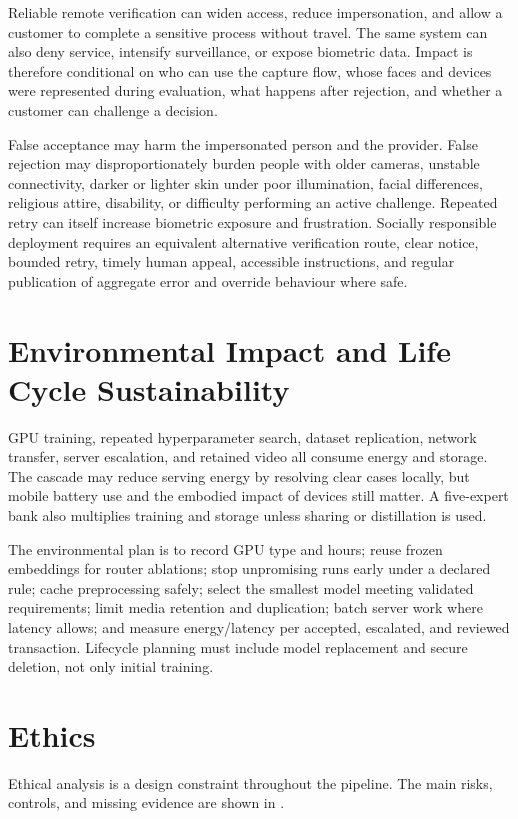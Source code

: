 Reliable remote verification can widen access, reduce impersonation, and allow a
customer to complete a sensitive process without travel. The same system can
also deny service, intensify surveillance, or expose biometric data. Impact is
therefore conditional on who can use the capture flow, whose faces and devices
were represented during evaluation, what happens after rejection, and whether a
customer can challenge a decision.

False acceptance may harm the impersonated person and the provider. False
rejection may disproportionately burden people with older cameras, unstable
connectivity, darker or lighter skin under poor illumination, facial differences,
religious attire, disability, or difficulty performing an active challenge.
Repeated retry can itself increase biometric exposure and frustration. Socially
responsible deployment requires an equivalent alternative verification route,
clear notice, bounded retry, timely human appeal, accessible instructions, and
regular publication of aggregate error and override behaviour where safe.

\section{Environmental Impact and Life Cycle Sustainability}

GPU training, repeated hyperparameter search, dataset replication, network
transfer, server escalation, and retained video all consume energy and storage.
The cascade may reduce serving energy by resolving clear cases locally, but mobile
battery use and the embodied impact of devices still matter. A five-expert bank
also multiplies training and storage unless sharing or distillation is used.

The environmental plan is to record GPU type and hours; reuse frozen embeddings
for router ablations; stop unpromising runs early under a declared rule; cache
preprocessing safely; select the smallest model meeting validated requirements;
limit media retention and duplication; batch server work where latency allows;
and measure energy/latency per accepted, escalated, and reviewed transaction.
Lifecycle planning must include model replacement and secure deletion, not only
initial training.

\section{Ethics}

Ethical analysis is a design constraint throughout the pipeline. The main risks,
controls, and missing evidence are shown in .

